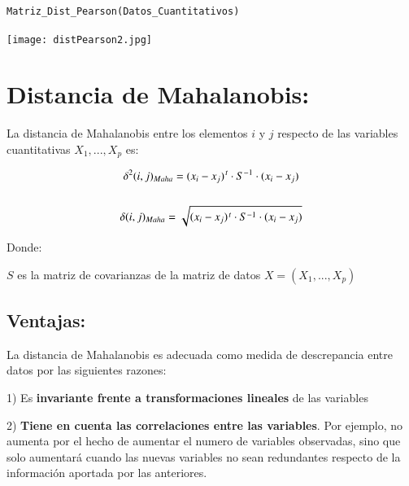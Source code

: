 \documentclass[12pt]{report} %
\begin{document}
\newpage

\begin{lstlisting}
Matriz_Dist_Pearson(Datos_Cuantitativos)
\end{lstlisting}

\texttt{[image: distPearson2.jpg]}


\newpage

\section{Distancia de Mahalanobis:}

\begin{tcolorbox}[toptitle=2mm,title= Distancia de Mahalanobis:   ]
La distancia de Mahalanobis entre los elementos $i$ y $j$ respecto de las variables cuantitativas $X_1,...,X_p$ es:

\begin{gather*}
 \delta^2(i,j)_{Maha}= (x_i - x_j)\hspace{0.03cm}^t \cdot S^{-1} \cdot (x_i - x_j ) \\ \\
 \delta(i,j)_{Maha}=\sqrt{(x_i - x_j)\hspace{0.03cm}^t \cdot S^{-1} \cdot (x_i - x_j ) }  
 \end{gather*}
 
Donde: 
\vspace{0.15cm}

$S$ es la matriz de covarianzas de la matriz de datos $X=(X_1,...,X_p)$ 
 
\end{tcolorbox} 
 
\subsection{Ventajas:}

La distancia de Mahalanobis es adecuada como medida de descrepancia entre datos por las siguientes razones:

1)\hspace{0.1cm} Es \textbf{invariante frente a transformaciones lineales} de las variables

2)\hspace{0.1cm} \textbf{Tiene en cuenta las correlaciones entre las variables}. Por ejemplo, no aumenta por el hecho de aumentar el numero de variables observadas, sino que solo aumentará cuando las nuevas variables no sean redundantes respecto de la información aportada por las anteriores.
\end{document}
